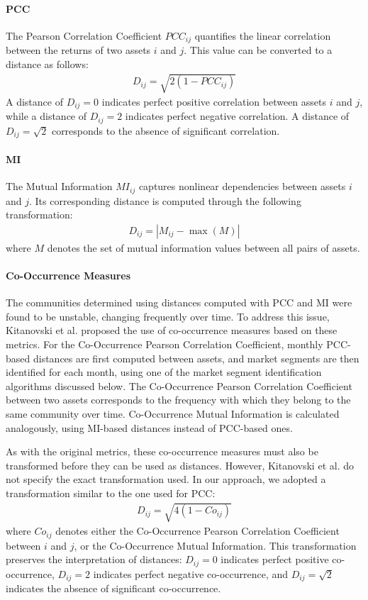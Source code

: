 \documentclass[acmsmall,screen,nonacm]{acmart}
\begin{document}
\paragraph{PCC}

The Pearson Correlation Coefficient $PCC_{ij}$ quantifies the linear correlation between the returns of two assets $i$ and $j$.
This value can be converted to a distance as follows:
\begin{align}
    D_{ij} = \sqrt{2(1 - PCC_{ij})}
\end{align}
A distance of $D_{ij} = 0$ indicates perfect positive correlation between assets $i$ and $j$, while a distance of $D_{ij} = 2$ indicates perfect negative correlation.
A distance of $D_{ij} = \sqrt{2}$ corresponds to the absence of significant correlation.

\paragraph{MI}

The Mutual Information $MI_{ij}$ captures nonlinear dependencies between assets $i$ and $j$.
Its corresponding distance is computed through the following transformation:
\begin{align}
    D_{ij} = |M_{ij} - \max(M)|
\end{align}
where $M$ denotes the set of mutual information values between all pairs of assets.

\paragraph{Co-Occurrence Measures}

The communities determined using distances computed with PCC and MI were found to be unstable, changing frequently over time.
To address this issue, Kitanovski et al. proposed the use of co-occurrence measures based on these metrics.
For the Co-Occurrence Pearson Correlation Coefficient, monthly PCC-based distances are first computed between assets, and market segments are then identified for each month, using one of the market segment identification algorithms discussed below.
The Co-Occurrence Pearson Correlation Coefficient between two assets corresponds to the frequency with which they belong to the same community over time.
Co-Occurrence Mutual Information is calculated analogously, using MI-based distances instead of PCC-based ones.

As with the original metrics, these co-occurrence measures must also be transformed before they can be used as distances.
However, Kitanovski et al. do not specify the exact transformation used.
In our approach, we adopted a transformation similar to the one used for PCC:
\begin{align}
    D_{ij} = \sqrt{4(1 - Co_{ij})}
\end{align}
where $Co_{ij}$ denotes either the Co-Occurrence Pearson Correlation Coefficient between $i$ and $j$, or the Co-Occurrence Mutual Information.
This transformation preserves the interpretation of distances: $D_{ij} = 0$ indicates perfect positive co-occurrence, $D_{ij} = 2$ indicates perfect negative co-occurrence, and $D_{ij} = \sqrt{2}$ indicates the absence of significant co-occurrence.
\end{document}
